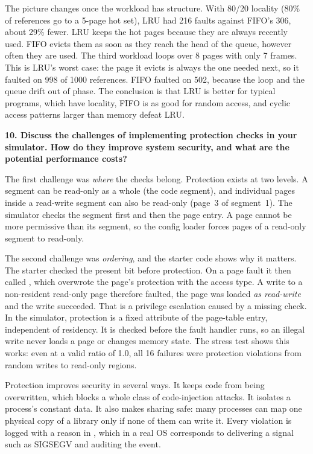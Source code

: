 \documentclass[11pt]{article}
\newcommand{\code}[1]{\texttt{\detokenize{#1}}}
\newcommand{\question}[1]{\par\medskip\noindent\textbf{#1}\par\smallskip}
\begin{document}
The picture changes once the workload has structure. With 80/20 locality (80\% of references go
to a 5-page hot set), LRU had 216 faults against FIFO's 306, about 29\% fewer. LRU keeps the hot pages
because they are always recently used. FIFO evicts them as soon as they reach the head of the queue,
however often they are used. The third workload loops over 8 pages with only 7 frames. This is LRU's
worst case: the page it evicts is always the one needed next, so it faulted on 998 of 1000
references. FIFO faulted on 502, because the loop and the queue drift out of phase. The conclusion
is that LRU is better for typical programs, which have locality, FIFO is as good for random access, and
cyclic access patterns larger than memory defeat LRU.

\question{10. Discuss the challenges of implementing protection checks in your simulator. How do they improve system security, and what are the potential performance costs?}
The first challenge was \emph{where} the checks belong. Protection exists at two levels. A segment
can be read-only as a whole (the code segment), and individual pages inside a read-write segment can
also be read-only (page~3 of segment~1). The simulator checks the segment first and then the page
entry. A page cannot be more permissive than its segment, so the config loader forces pages of a
read-only segment to read-only.

The second challenge was \emph{ordering}, and the starter code shows why it matters. The
starter checked the present bit before protection. On a page fault it then called
\code{setFrame(page, frame, accessType)}, which overwrote the page's protection with the access type.
A write to a non-resident read-only page therefore faulted, the page was loaded \emph{as read-write}
and the write succeeded. That is a privilege escalation caused by a missing check. In the simulator,
protection is a fixed attribute of the page-table entry, independent of residency. It is checked
before the fault handler runs, so an illegal write never loads a page or changes memory state. The
stress test shows this works: even at a valid ratio of 1.0, all 16 failures were protection
violations from random writes to read-only regions.

Protection improves security in several ways. It keeps code from being overwritten, which
blocks a whole class of code-injection attacks. It isolates a process's constant data. It also makes
sharing safe: many processes can map one physical copy of a library only if none of them can write it.
Every violation is logged with a reason in \code{errors.log}, which in a real OS corresponds to
delivering a signal such as SIGSEGV and auditing the event.
\end{document}
